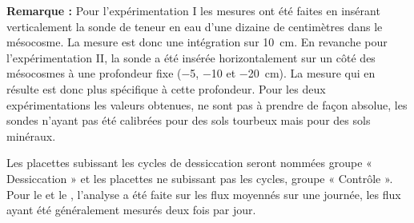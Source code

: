 \begin{center}
\begin{minipage}{.85\textwidth}
\setlength{\parindent}{-10pt}%
\onehalfspacing
\textbf{Remarque :} %
Pour l'expérimentation I les mesures ont été faites en insérant verticalement la sonde de teneur en eau d'une dizaine de centimètres dans le mésocosme.
La mesure est donc une intégration sur \SI{10}{\centi\metre}.
En revanche pour l'expérimentation II, la sonde a été insérée horizontalement sur un côté des mésocosmes à une profondeur fixe (\num{-5}, \num{-10} et \SI{-20}{\centi\metre}).
La mesure qui en résulte est donc plus spécifique à cette profondeur.
Pour les deux expérimentations les valeurs obtenues, ne sont pas à prendre de façon absolue, les sondes n'ayant pas été calibrées pour des sols tourbeux mais pour des sols minéraux.
\end{minipage}
\end{center}
Les placettes subissant les cycles de dessiccation seront nommées groupe « Dessiccation » et les placettes ne subissant pas les cycles, groupe « Contrôle ».
Pour le \coo et le \chh, l'analyse a été faite sur les flux moyennés sur une journée, les flux ayant été généralement mesurés deux fois par jour.



